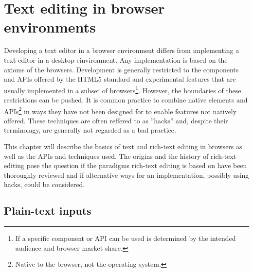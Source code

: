 \chapter{Text editing in browser environments}


Developing a text editor in a browser environment differs from implementing a text editor in a desktop einvironment. Any implementation is based on the axioms of the browsers. Development is generally restricted to the components and APIs offered by the HTML5 standard and experimental features that are usually implemented in a subset of browsers\footnote{If a specific component or API can be used is determined by the intended audience and browser market share.}. However, the boundaries of these restrictions can be pushed. It is common practice to combine native elements and APIs\footnote{Native to the browser, not the operating system.} in ways they have not been designed for to enable features not natively offered. These techniques are often reffered to as ''hacks'' and, despite their terminolagy, are generally not regarded as a bad practice.

This chapter will describe the basics of text and rich-text editing in browsers as well as the APIs and techniques used. The origins and the history of rich-text editing pose the question if the paradigms rich-text editing is based on have been thoroughly reviewed and if alternative ways for an implementation, possibly using hacks, could be considered.


\section{Plain-text inputs}

